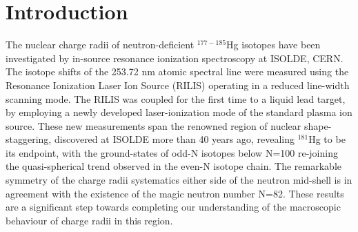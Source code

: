\section{Introduction}
The nuclear charge radii of neutron-deficient $^{177-185}$Hg isotopes have been investigated by in-source resonance ionization spectroscopy at ISOLDE, CERN.  The isotope shifts of the 253.72 nm atomic spectral line were measured using the Resonance Ionization Laser Ion Source (RILIS) operating in a reduced line-width scanning mode.  The RILIS was coupled for the first time to a liquid lead target, by employing a newly developed laser-ionization mode of the standard plasma ion source. These new measurements span the renowned region of nuclear shape-staggering, discovered at ISOLDE more than 40 years ago, revealing $^{181}$Hg to be its endpoint, with the ground-states of odd-N isotopes below N=100 re-joining the quasi-spherical trend observed in the even-N isotope chain.  The remarkable symmetry of the charge radii systematics either side of the neutron mid-shell is in agreement with the existence of the magic neutron number N=82.
These results are a significant step towards completing our understanding of the macroscopic behaviour of charge radii in this region.
